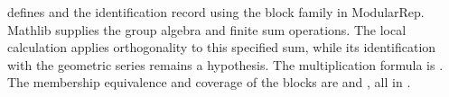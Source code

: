 \begin{implementation}
 defines
 and the identification record
 using the block family in ModularRep.
Mathlib supplies the group algebra and finite sum operations. The local
calculation applies orthogonality to this specified sum, while its
identification with the geometric series remains a hypothesis.
The multiplication formula is
. The membership equivalence and
coverage of the blocks are 
and , all in
.
\end{implementation}

